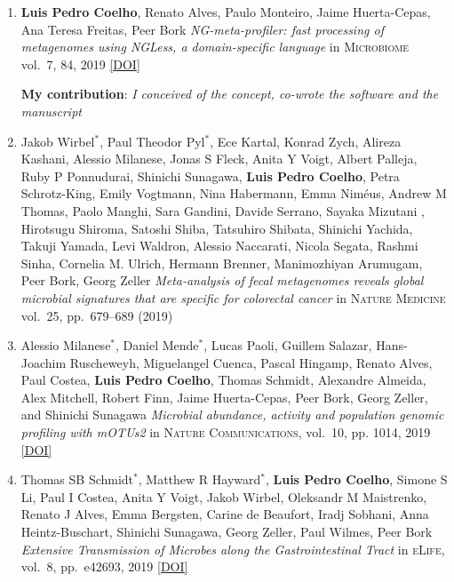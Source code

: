 \documentclass{article}
\newcommand\showdoi[1]{%
    \href{http://dx.doi.org/#1}{[DOI]}%
}
\newcommand\pubname[1]{\textsc{#1}}
\newcommand\contribution[1]{\relax\hfill\break\textbf{My contribution}: \textit{#1}}
\newcommand\costar{${}^{*}$}
\begin{document}
\begin{enumerate}[resume]
\item \textbf{Luis Pedro Coelho}, Renato Alves, Paulo Monteiro, Jaime
Huerta-Cepas, Ana Teresa Freitas, Peer Bork \emph{NG-meta-profiler: fast
processing of metagenomes using NGLess, a domain-specific language} in
\pubname{Microbiome} vol.\ 7, 84, 2019 \showdoi{10.1186/s40168-019-0684-8}
\contribution{I conceived of the concept, co-wrote the software and the manuscript}

\item Jakob Wirbel\costar, Paul Theodor Pyl\costar, Ece Kartal, Konrad Zych,
Alireza Kashani, Alessio Milanese, Jonas S Fleck, Anita Y Voigt, Albert
Palleja, Ruby P Ponnudurai, Shinichi Sunagawa, \textbf{Luis Pedro Coelho},
Petra Schrotz-King, Emily Vogtmann, Nina Habermann, Emma Niméus, Andrew M
Thomas, Paolo Manghi, Sara Gandini, Davide Serrano, Sayaka Mizutani , Hirotsugu
Shiroma, Satoshi Shiba, Tatsuhiro Shibata, Shinichi Yachida, Takuji Yamada,
Levi Waldron, Alessio Naccarati, Nicola Segata, Rashmi Sinha, Cornelia M.
Ulrich, Hermann Brenner, Manimozhiyan Arumugam, Peer Bork, Georg Zeller
\emph{Meta-analysis of fecal metagenomes reveals global microbial signatures
that are specific for colorectal cancer} in \pubname{Nature Medicine} vol.\ 25,
pp.\ 679–689 (2019)

\item Alessio Milanese\costar, Daniel Mende\costar, Lucas Paoli, Guillem
Salazar, Hans-Joachim Ruscheweyh, Miguelangel Cuenca, Pascal Hingamp, Renato
Alves, Paul Costea, \textbf{Luis Pedro Coelho}, Thomas Schmidt, Alexandre
Almeida, Alex Mitchell, Robert Finn, Jaime Huerta-Cepas, Peer Bork, Georg
Zeller, and Shinichi Sunagawa \emph{Microbial abundance, activity and
population genomic profiling with mOTUs2} in \pubname{Nature Communications},
vol.\ 10, pp. 1014, 2019 \showdoi{10.1038/s41467-019-08844-4}

\item Thomas SB Schmidt\costar, Matthew R Hayward\costar, \textbf{Luis Pedro
Coelho}, Simone S Li, Paul I Costea, Anita Y Voigt, Jakob Wirbel, Oleksandr M
Maistrenko, Renato J Alves, Emma Bergsten, Carine de Beaufort, Iradj Sobhani,
Anna Heintz-Buschart, Shinichi Sunagawa, Georg Zeller, Paul Wilmes, Peer Bork
\emph{Extensive Transmission of Microbes along the Gastrointestinal Tract} in
\pubname{eLife}, vol.\ 8, pp.\ e42693, 2019 \showdoi{10.7554/eLife.42693}


\end{enumerate}
\end{document}
